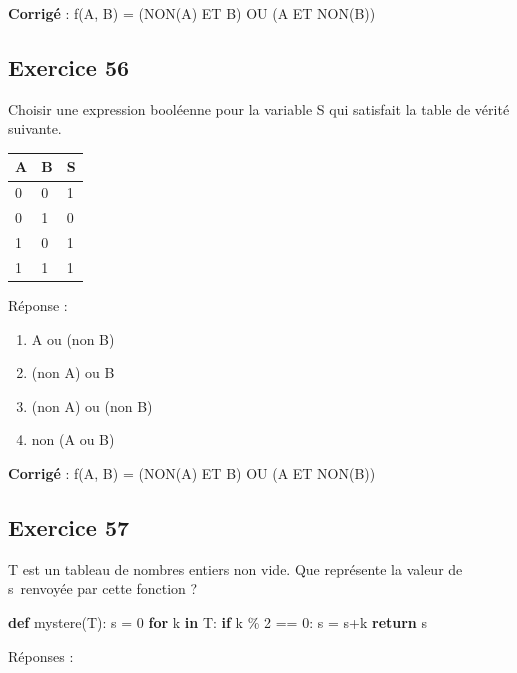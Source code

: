 \documentclass[11pt]{article}
\providecommand{\tightlist}{%
      \setlength{\itemsep}{0pt}\setlength{\parskip}{0pt}}
\newenvironment{Shaded}{}{}
\newcommand{\KeywordTok}[1]{\textcolor[rgb]{0.00,0.44,0.13}{\textbf{{#1}}}}
\newcommand{\DecValTok}[1]{\textcolor[rgb]{0.25,0.63,0.44}{{#1}}}
\newcommand{\NormalTok}[1]{{#1}}
\newcommand{\ControlFlowTok}[1]{\textcolor[rgb]{0.00,0.44,0.13}{\textbf{{#1}}}}
\newcommand{\OperatorTok}[1]{\textcolor[rgb]{0.40,0.40,0.40}{{#1}}}
\begin{document}
    \textbf{Corrigé} : f(A, B) = (NON(A) ET B) OU (A ET NON(B))

    \hypertarget{exercice-56}{%
\subsection{Exercice 56}\label{exercice-56}}

Choisir une expression booléenne pour la variable S qui satisfait la
table de vérité suivante.

\begin{longtable}[]{@{}lll@{}}
\toprule
A & B & S\tabularnewline
\midrule
\endhead
0 & 0 & 1\tabularnewline
0 & 1 & 0\tabularnewline
1 & 0 & 1\tabularnewline
1 & 1 & 1\tabularnewline
\bottomrule
\end{longtable}

Réponse :

\begin{enumerate}
\def\labelenumi{\arabic{enumi}.}
\tightlist
\item
  A ou (non B)
\item
  (non A) ou B
\item
  (non A) ou (non B)
\item
  non (A ou B)
\end{enumerate}

    \textbf{Corrigé} : f(A, B) = (NON(A) ET B) OU (A ET NON(B))

    \hypertarget{exercice-57}{%
\subsection{Exercice 57}\label{exercice-57}}

T est un tableau de nombres entiers non vide. Que représente la valeur
de s~renvoyée par cette fonction ?

\begin{Shaded}
\begin{Highlighting}[]
\KeywordTok{def}\NormalTok{ mystere(T):}
\NormalTok{    s }\OperatorTok{=} \DecValTok{0}
    \ControlFlowTok{for}\NormalTok{ k }\KeywordTok{in}\NormalTok{ T:}
        \ControlFlowTok{if}\NormalTok{ k }\OperatorTok{\%} \DecValTok{2} \OperatorTok{==} \DecValTok{0}\NormalTok{:}
\NormalTok{            s }\OperatorTok{=}\NormalTok{ s}\OperatorTok{+}\NormalTok{k}
    \ControlFlowTok{return}\NormalTok{ s}
\end{Highlighting}
\end{Shaded}

Réponses :
\end{document}
